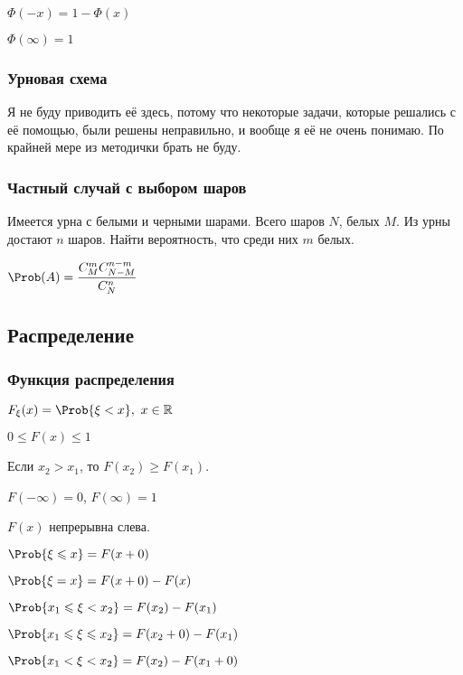 $\Phi(-x) = 1 - \Phi(x)$

$\Phi(\infty) = 1$

\subsubsection{Урновая схема}

Я не буду приводить её здесь, потому что некоторые задачи, которые решались с её помощью, были решены неправильно, и вообще я её не очень понимаю. По крайней мере из методички брать не буду.

\subsubsection{Частный случай с выбором шаров}

Имеется урна с белыми и черными шарами. Всего шаров $N$, белых $M$. Из урны достают $n$ шаров. Найти вероятность, что среди них $m$ белых.

$\displaystyle \Prob(A) = \frac{C_M^m C_{N-M}^{n-m}}{C_N^n} $

\newcommand{\M}{\mathsf{M}}
\newcommand{\D}{\mathsf{D}}
\newcommand{\cov}{\mathrm{cov}}

\subsection{Распределение}

\subsubsection{Функция распределения}

$\displaystyle F_\xi(x) = \Prob\{\xi < x\},\ x\in\mathbb{R} $

$\displaystyle 0 \leqslant F(x) \leqslant 1 $

Если $x_2 > x_1 $, то $F(x_2)\geqslant F(x_1)$.

$F(-\infty) = 0 $, $F(\infty) = 1$

$\displaystyle F(x) $ непрерывна слева.

$\displaystyle \Prob\{\xi \leqslant x\} = F(x + 0) $

$\displaystyle \Prob\{\xi = x\} = F(x+0) - F(x) $

$\displaystyle \Prob\{x_1 \leqslant \xi < x_2\} = F(x_2) - F(x_1) $

$\displaystyle \Prob\{x_1 \leqslant \xi \leqslant x_2\} = F(x_2+0) - F(x_1) $

$\displaystyle \Prob\{x_1 < \xi < x_2\} = F(x_2) - F(x_1+0) $

